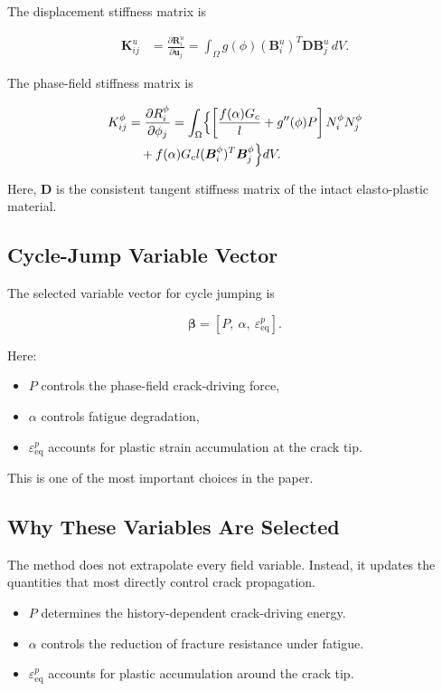 ﻿\documentclass[11pt,a4paper]{article}
\begin{document}
The displacement stiffness matrix is

\[
\begin{aligned}
\bm{K}_{ij}^{u}
&=
\frac{\partial \bm{R}_i^u}{\partial \bm{u}_j}
=
\int_{\Omega}
g(\phi)
(\bm{B}_i^u)^T
\bm{D}
\bm{B}_j^u
\,dV.
\end{aligned}
\]

The phase-field stiffness matrix is

\[
\begin{aligned}
K_{ij}^{\phi}
&=
\frac{\partial R_i^\phi}{\partial \phi_j}
=
\int_{\Omega}
\Bigl\{
\left[
\frac{f(\alpha)G_c}{l}
+
g''(\phi)P
\right]
N_i^\phi N_j^\phi \\
&\quad
+
f(\alpha)G_c l
(\bm{B}_i^\phi)^T
\bm{B}_j^\phi
\Bigr\}dV.
\end{aligned}
\]

Here, $\bm{D}$ is the consistent tangent stiffness matrix of the intact elasto-plastic material.

\subsection{Cycle-Jump Variable Vector}

The selected variable vector for cycle jumping is

\[
\bm{\beta}
=
\left[
P,\ \alpha,\ \varepsilon_{\mathrm{eq}}^p
\right].
\]

Here:

\begin{itemize}[leftmargin=*]
    \item $P$ controls the phase-field crack-driving force,
    \item $\alpha$ controls fatigue degradation,
    \item $\varepsilon_{\mathrm{eq}}^p$ accounts for plastic strain accumulation at the crack tip.
\end{itemize}

This is one of the most important choices in the paper.

\subsection{Why These Variables Are Selected}

The method does not extrapolate every field variable. Instead, it updates the quantities that most directly control crack propagation.

\begin{itemize}[leftmargin=*]
    \item $P$ determines the history-dependent crack-driving energy.
    \item $\alpha$ controls the reduction of fracture resistance under fatigue.
    \item $\varepsilon_{\mathrm{eq}}^p$ accounts for plastic accumulation around the crack tip.
\end{itemize}
\end{document}
